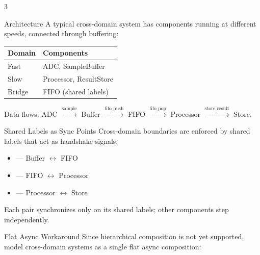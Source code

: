 



\begin{multicols}{3}
\footnotesize


\begin{cheatbox}{Architecture}
A typical cross-domain system has components running at
different speeds, connected through buffering:

\medskip
\renewcommand{\arraystretch}{1.1}
\begin{tabularx}{\linewidth}{@{}l X@{}}
\toprule
\scriptsize\textbf{Domain} & \scriptsize\textbf{Components} \\
\midrule
Fast  & ADC, SampleBuffer \\
Slow  & Processor, ResultStore \\
Bridge & FIFO (shared labels) \\
\bottomrule
\end{tabularx}

\medskip
Data flows: ADC $\xrightarrow{\text{sample}}$ Buffer
$\xrightarrow{\text{fifo\_push}}$ FIFO
$\xrightarrow{\text{fifo\_pop}}$ Processor
$\xrightarrow{\text{store\_result}}$ Store.
\end{cheatbox}

\begin{cheatbox}{Shared Labels as Sync Points}
Cross-domain boundaries are enforced by shared labels that
act as handshake signals:

\begin{itemize}
  \item {} --- Buffer $\leftrightarrow$ FIFO
  \item {} --- FIFO $\leftrightarrow$ Processor
  \item {} --- Processor $\leftrightarrow$ Store
\end{itemize}

Each pair synchronizes only on its shared labels; other
components step independently.
\end{cheatbox}

\columnbreak


\begin{cheatbox}{Flat Async Workaround}
Since hierarchical composition is not yet supported, model
cross-domain systems as a single flat async composition:


\end{cheatbox}
\end{multicols}
